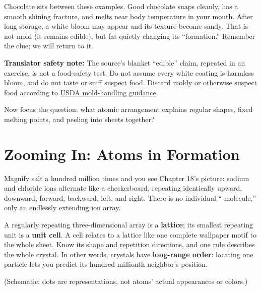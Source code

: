 Chocolate sits between these examples. Good chocolate snaps cleanly, has a smooth shining fracture, and melts near body temperature in your mouth. After long storage, a white bloom may appear and its texture become sandy. That is not mold (it remains edible), but fat quietly changing its ``formation.'' Remember the clue; we will return to it.

\textbf{Translator safety note:} The source's blanket ``edible'' claim, repeated in an exercise, is not a food-safety test. Do not assume every white coating is harmless bloom, and do not taste or sniff suspect food. Discard moldy or otherwise suspect food according to \href{https://www.fsis.usda.gov/food-safety/safe-food-handling-and-preparation/food-safety-basics/molds-food-are-they-dangerous}{USDA mold-handling guidance}.

Now focus the question: what atomic arrangement explains regular shapes, fixed melting points, and peeling into sheets together?

\section{Zooming In: Atoms in Formation}

Magnify salt a hundred million times and you see Chapter 18's picture: sodium and chloride ions alternate like a checkerboard, repeating identically upward, downward, forward, backward, left, and right. There is no individual `` molecule,'' only an endlessly extending ion array.

A regularly repeating three-dimensional array is a \textbf{lattice}; its smallest repeating unit is a \textbf{unit cell}. A cell relates to a lattice like one complete wallpaper motif to the whole sheet. Know its shape and repetition directions, and one rule describes the whole crystal. In other words, crystals have \textbf{long-range order}: locating one particle lets you predict its hundred-millionth neighbor's position.

\begin{center}
\end{center}
(Schematic: dots are representations, not atoms' actual appearances or colors.)

